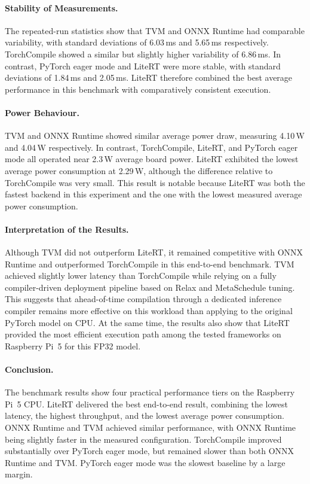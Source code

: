 \documentclass[12pt,a4paper]{report}
\begin{document}
\paragraph{Stability of Measurements.}
The repeated-run statistics show that TVM and ONNX Runtime had comparable
variability, with standard deviations of 6.03\,ms and 5.65\,ms respectively.
TorchCompile showed a similar but slightly higher variability of 6.86\,ms. In
contrast, PyTorch eager mode and LiteRT were more stable, with standard
deviations of 1.84\,ms and 2.05\,ms. LiteRT therefore combined the best average
performance in this benchmark with comparatively consistent execution.

\paragraph{Power Behaviour.}
TVM and ONNX Runtime showed similar average power draw, measuring 4.10\,W and
4.04\,W respectively. In contrast, TorchCompile, LiteRT, and PyTorch eager mode
all operated near 2.3\,W average board power. LiteRT exhibited the lowest
average power consumption at 2.29\,W, although the difference relative to
TorchCompile was very small. This result is notable because LiteRT was both the
fastest backend in this experiment and the one with the lowest measured average
power consumption.

\paragraph{Interpretation of the Results.}
Although TVM did not outperform LiteRT, it remained competitive with ONNX
Runtime and outperformed TorchCompile in this end-to-end benchmark. TVM
achieved slightly lower latency than TorchCompile while relying on a fully
compiler-driven deployment pipeline based on Relax and MetaSchedule tuning. This
suggests that ahead-of-time compilation through a dedicated inference compiler
remains more effective on this workload than applying  to
the original PyTorch model on CPU. At the same time, the results also show that
LiteRT provided the most efficient execution path among the tested frameworks on
Raspberry Pi~5 for this FP32 model.

\paragraph{Conclusion.}
The benchmark results show four practical performance tiers on the Raspberry
Pi~5 CPU. LiteRT delivered the best end-to-end result, combining the lowest
latency, the highest throughput, and the lowest average power consumption. ONNX
Runtime and TVM achieved similar performance, with ONNX Runtime being slightly
faster in the measured configuration. TorchCompile improved substantially over
PyTorch eager mode, but remained slower than both ONNX Runtime and TVM.
PyTorch eager mode was the slowest baseline by a large margin.
\end{document}
